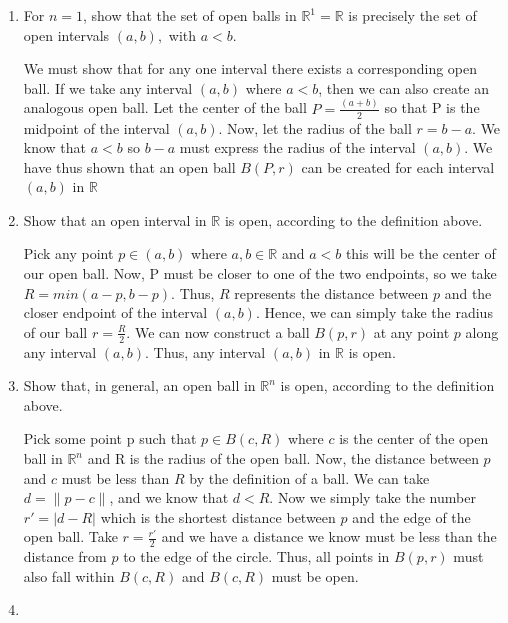 \documentclass[11pt]{article}
\begin{document}
\begin{enumerate}[label=(\alph*)]

	\item 

	For $n = 1$, show that the set of open balls in $\mathbb{R}^1 = \mathbb{R}$ is precisely the set of open intervals $(a,b),$ with $a < b$.

	We must show that for any one interval there exists a corresponding open ball. If we take any interval $(a,b)$ where $a < b$, then we can also create an analogous open ball. Let the center of the ball $P = \frac{(a + b)}{2}$ so that P is the midpoint of the interval $(a, b)$. Now, let the radius of the ball $r = b - a$. We know that $a < b$ so $b - a$ must express the radius of the interval $(a,b)$. We have thus shown that an open ball $B(P,r)$ can be created for each interval $(a,b)$ in $\mathbb{R}$
	
	\item
	
	Show that an open interval in $\mathbb{R}$ is open, according to the definition above.
	
	Pick any point $p \in (a,b)$ where $a,b \in \mathbb{R}$ and $a < b$ this will be the center of our open ball. Now, P must be closer to one of the two endpoints, so we take $R = min(a - p, b - p)$. Thus, $R$ represents the distance between $p$ and the closer endpoint of the interval $(a,b)$. Hence, we can simply take the radius of our ball $r = \frac{R}{2}$. We can now construct a ball $B(p,r)$ at any point $p$ along any interval $(a,b)$. Thus, any interval $(a,b)$ in $\mathbb{R}$ is open.
	
	\item
	
	Show that, in general, an open ball in $\mathbb{R}^n$ is open, according to the definition above.
	
	Pick some point p such that $p \in B(c,R)$ where $c$ is the center of the open ball in $\mathbb{R}^n$ and R is the radius of the open ball. Now, the distance between $p$ and $c$ must be less than $R$ by the definition of a ball. We can take $d = \|  p - c \|$, and we know that $d < R$. Now we simply take the number $r'  = | d - R |$ which is the shortest distance between $p$ and the edge of the open ball. Take $r = \frac{r'}{2}$ and we have a distance we know must be less than the distance from $p$ to the edge of the circle. Thus, all points in $B(p,r)$ must also fall within $B(c,R)$ and $B(c,R)$ must be open.
	
	\item
	

\end{enumerate}
\end{document}
